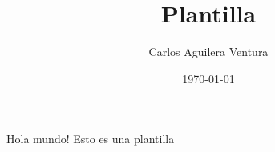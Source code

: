 \documentclass[a4paper]{article}
\title{Plantilla}
\author{Carlos Aguilera Ventura}
\date{\today}
\begin{document}
\maketitle \newpage
Hola mundo! Esto es una plantilla
\end{document}
